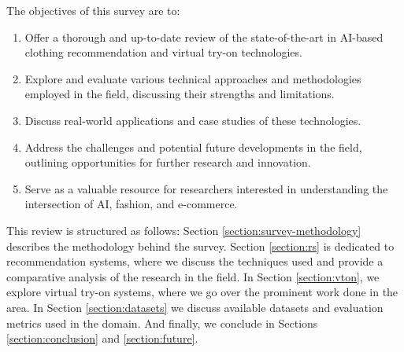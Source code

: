 	The objectives of this survey are to:

	\begin{enumerate}
		\item Offer a thorough and up-to-date review of the state-of-the-art in AI-based clothing recommendation and virtual try-on technologies.
		\item Explore and evaluate various technical approaches and methodologies employed in the field, discussing their strengths and limitations.
		\item Discuss real-world applications and case studies of these technologies.
		\item Address the challenges and potential future developments in the field, outlining opportunities for further research and innovation.
		\item Serve as a valuable resource for researchers interested in understanding the intersection of AI, fashion, and e-commerce.
	\end{enumerate}

	This review is structured as follows: Section \ref{section:survey-methodology} describes the methodology behind the survey. Section \ref{section:rs} is dedicated to recommendation systems, where we discuss the techniques used and provide a comparative analysis of the research in the field. In Section \ref{section:vton}, we explore virtual try-on systems, where we go over the prominent work done in the area. In Section \ref{section:datasets} we discuss available datasets and evaluation metrics used in the domain. And finally, we conclude in Sections \ref{section:conclusion} and \ref{section:future}.